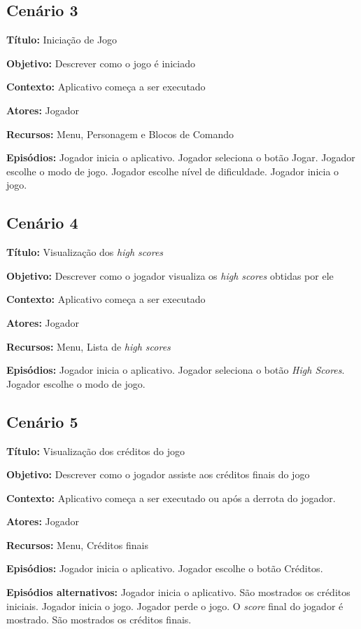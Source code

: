 \subsection{Cenário 3}

\textbf{Título:} Iniciação de Jogo

\textbf{Objetivo:} Descrever como o jogo é iniciado

\textbf{Contexto:} Aplicativo começa a ser executado 

\textbf{Atores:} Jogador

\textbf{Recursos:} Menu, Personagem e Blocos de Comando

\textbf{Episódios:} Jogador inicia o aplicativo. Jogador seleciona o botão Jogar. Jogador escolhe o modo de jogo. Jogador escolhe nível de dificuldade. Jogador inicia o jogo.

\subsection{Cenário 4}

\textbf{Título:} Visualização dos \textit{high scores}

\textbf{Objetivo:} Descrever como o jogador visualiza os \textit{high scores} obtidas por ele

\textbf{Contexto:} Aplicativo começa a ser executado

\textbf{Atores:} Jogador

\textbf{Recursos:} Menu, Lista de \textit{high scores}

\textbf{Episódios:} Jogador inicia o aplicativo. Jogador seleciona o botão \textit{High Scores}. Jogador escolhe o modo de jogo.

\subsection{Cenário 5}

\textbf{Título:} Visualização dos créditos do jogo

\textbf{Objetivo:} Descrever como o jogador assiste aos créditos finais do jogo

\textbf{Contexto:} Aplicativo começa a ser executado ou após a derrota do jogador.

\textbf{Atores:} Jogador

\textbf{Recursos:} Menu, Créditos finais

\textbf{Episódios:} Jogador inicia o aplicativo. Jogador escolhe o botão Créditos.

\textbf{Episódios alternativos:} Jogador inicia o aplicativo. São mostrados os créditos iniciais. Jogador inicia o jogo. Jogador perde o jogo. O \textit{score} final do jogador é mostrado. São mostrados os créditos finais.

